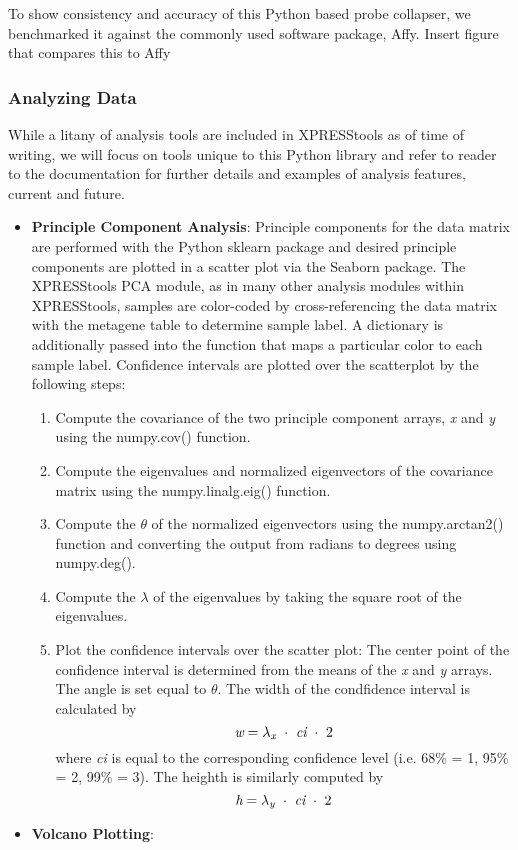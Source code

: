 \documentclass[11pt, a4paper, oneside]{article}
\begin{document}
To show consistency and accuracy of this Python based probe collapser, we benchmarked it against the commonly used software package, Affy.
{Insert figure that compares this to Affy}

\subsubsection{Analyzing Data}

While a litany of analysis tools are included in XPRESStools as of time of writing, we will focus on tools unique to this Python library and refer to reader to the documentation for further details and examples of analysis features, current and future.

\begin{itemize}
  \item \textbf{Principle Component Analysis}: Principle components for the data matrix are performed with the Python sklearn package and desired principle components are plotted in a scatter plot via the Seaborn package{}. The XPRESStools PCA module, as in many other analysis modules within XPRESStools, samples are color-coded by cross-referencing the data matrix with the metagene table to determine sample label. A dictionary is additionally passed into the function that maps a particular color to each sample label. Confidence intervals are plotted over the scatterplot by the following steps:

  \begin{enumerate}
    \item Compute the covariance of the two principle component arrays, \textit{x} and \textit{y} using the numpy.cov() function.

    \item Compute the eigenvalues and normalized eigenvectors of the covariance matrix using the numpy.linalg.eig() function.

    \item Compute the $\theta$ of the normalized eigenvectors using the numpy.arctan2() function and converting the output from radians to degrees using numpy.deg().

    \item Compute the $\lambda$ of the eigenvalues by taking the square root of the eigenvalues.

    \item Plot the confidence intervals over the scatter plot: The center point of the confidence interval is determined from the means of the \textit{x} and \textit{y} arrays. The angle is set equal to $\theta$. The width of the condfidence interval is calculated by
    \[
    \textit{w} = \lambda _{\textit{\scriptsize{x}}}\ \cdot\ \textit{ci}\ \cdot\ 2
    \]
    where \textit{ci} is equal to the corresponding confidence level (i.e. 68\% = 1, 95\% = 2, 99\% = 3). The heighth is similarly computed by
    \[
    \textit{h} = \lambda _{\textit{\scriptsize{y}}}\ \cdot\ \textit{ci}\ \cdot\ 2
    \]
  \end{enumerate}

  \item \textbf{Volcano Plotting}:


\end{itemize}
\end{document}

